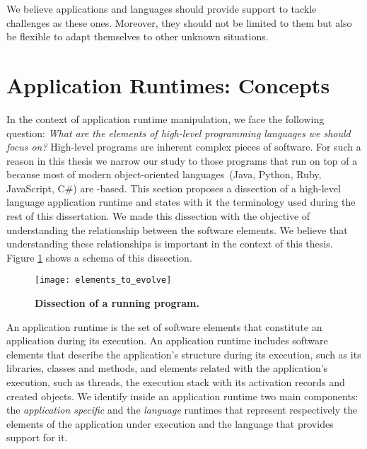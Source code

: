 We believe applications and languages should provide support to tackle challenges as these ones. Moreover, they should not be limited to them but also be flexible to adapt themselves to other unknown situations.

\section{Application Runtimes: Concepts}

In the context of application runtime manipulation, we face the following question: \emph{What are the elements of high-level programming languages we should focus on?} High-level programs are inherent complex pieces of software. For such a reason in this thesis we narrow our study to those programs that run on top of a \VM because most of modern object-oriented languages~(\eg Java, Python, Ruby, JavaScript, C\#) are \VM-based.
This section proposes a dissection of a high-level language application runtime and states with it the terminology used during the rest of this dissertation. We made this dissection with the objective of understanding the relationship between the software elements. We believe that understanding these relationships is important in the context of this thesis. Figure \ref{fig:whatToEvolve} shows a schema of this dissection.

\begin{figure}[!ht]
\begin{center}
\texttt{[image: elements\_to\_evolve]}
\caption{\textbf{Dissection of a running program.}\label{fig:whatToEvolve} }
\end{center}
\end{figure}

An application runtime is the set of software elements that constitute an application during its execution. An application runtime includes software elements that describe the application's structure during its execution, such as its libraries, classes and methods, and elements related with the application's execution, such as threads, the execution stack with its activation records and created objects. We identify inside an application runtime two main components: the \emph{application specific} and the \emph{language} runtimes that represent respectively the elements of the application under execution and the language that provides support for it.

